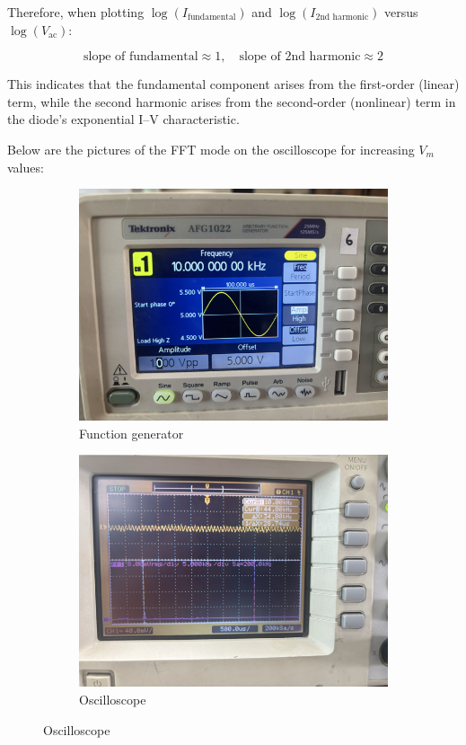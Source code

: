 \documentclass[12pt,a4paper]{article}
\begin{document}
Therefore, when plotting $\log(I_{\text{fundamental}})$ and $\log(I_{\text{2nd harmonic}})$ versus 
$\log(V_{\text{ac}})$:

\[
\text{slope of fundamental} \approx 1, \quad
\text{slope of 2nd harmonic} \approx 2
\]

This indicates that the fundamental component arises from the first-order (linear) term, while 
the second harmonic arises from the second-order (nonlinear) term in the diode’s exponential I–V characteristic.

Below are the pictures of the FFT mode on the oscilloscope for increasing $V_m$ values:

\begin{figure}[h!]
\centering
\begin{subfigure}[b]{0.47\linewidth}
    \centering
    \includegraphics[width=\textwidth]{Experiment_5/figs/FFT_gen_1.png}
    \caption{Function generator}
\end{subfigure}
\begin{subfigure}[b]{0.48\linewidth}
    \centering
    \includegraphics[width=\textwidth]{Experiment_5/figs/FFT_osc_1.png}
    \caption{Oscilloscope}
\end{subfigure}
\end{figure}
\end{document}
